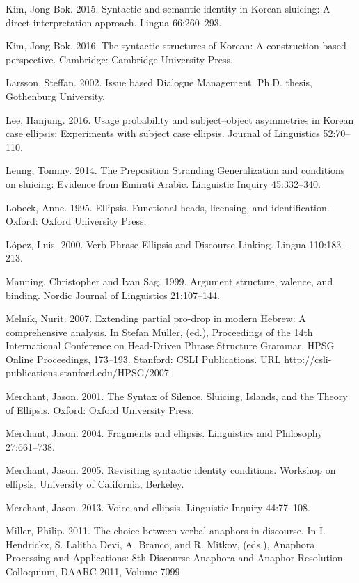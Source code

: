 \documentclass[output=paper]{langsci/langscibook}
\begin{document}
\begin{description}
\item Kim, Jong-Bok. 2015. Syntactic and semantic identity in Korean sluicing: A direct interpretation approach. Lingua 66:260--293.
\item Kim, Jong-Bok. 2016. The syntactic structures of Korean: A construction-based perspective. Cambridge: Cambridge University Press.
\item Larsson, Steffan. 2002. Issue based Dialogue Management. Ph.D. thesis, Gothenburg
University.
\item Lee, Hanjung. 2016. Usage probability and subject--object asymmetries in Korean case ellipsis: Experiments with subject case ellipsis. Journal of Linguistics 52:70--110.
\item Leung, Tommy. 2014. The Preposition Stranding Generalization and conditions on sluicing: Evidence from Emirati Arabic. Linguistic Inquiry 45:332--340.
\item Lobeck, Anne. 1995. Ellipsis. Functional heads, licensing, and identification. Oxford: Oxford University Press.
\item L\'{o}pez, Luis. 2000. Verb Phrase Ellipsis and Discourse-Linking. Lingua 110:183--213.
\item Manning, Christopher and Ivan Sag. 1999. Argument structure, valence, and binding. Nordic Journal of Linguistics 21:107--144.
\item Melnik, Nurit. 2007. Extending partial pro-drop in modern Hebrew: A comprehensive analysis. In Stefan M\"{u}ller, (ed.), Proceedings of the 14th International Conference on Head-Driven Phrase Structure Grammar, HPSG Online Proceedings, 173--193. Stanford: CSLI Publications. URL http://csli-publications.stanford.edu/HPSG/2007.
\item Merchant, Jason. 2001. The Syntax of Silence. Sluicing, Islands, and the Theory of Ellipsis.
Oxford: Oxford University Press.
\item Merchant, Jason. 2004. Fragments and ellipsis. Linguistics and Philosophy 27:661--738.
\item Merchant, Jason. 2005. Revisiting syntactic identity conditions. Workshop on ellipsis, University of California, Berkeley.
\item Merchant, Jason. 2013. Voice and ellipsis. Linguistic Inquiry 44:77--108.
\item Miller, Philip. 2011. The choice between verbal anaphors in discourse. In I. Hendrickx,
S. Lalitha Devi, A. Branco, and R. Mitkov, (eds.), Anaphora Processing and Applications:
8th Discourse Anaphora and Anaphor Resolution Colloquium, DAARC 2011, Volume 7099

\end{description}
\end{document}
